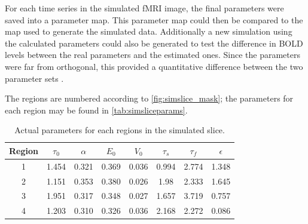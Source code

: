 For each time series in the simulated \ac{fMRI} image, the final parameters were saved
into a parameter map. This parameter map could then be compared to the map used to generate the
simulated data. Additionally a new simulation using the calculated parameters could also be
generated to test the difference in \ac{BOLD} levels between the real parameters and the
estimated ones. Since the parameters were far from orthogonal,
 this provided a quantitative difference between the two parameter sets \cite{Deneux2006}.

The regions are numbered according to \autoref{fig:simslice_mask}; the parameters
for each region may be found in \autoref{tab:simsliceparams}.

\begin{table}[t]
\centering
\begin{tabular}{|c |c | c | c | c | c | c | c |}
\hline
Region & $\tau_0$ & $\alpha$ & $E_0$    & $V_0$    & $\tau_s$ & $\tau_f$ & $\epsilon$  \\
\hline
1 & 1.454& 0.321& 0.369& 0.036& 0.994& 2.774& 1.348\\
2 &1.151&  0.353& 0.380& 0.026& 1.98&  2.333& 1.645 \\
3 &1.951&  0.317& 0.348& 0.027& 1.657& 3.719& 0.757 \\
4 &1.203 & 0.310& 0.326& 0.036& 2.168& 2.272& 0.086\\
\hline
\end{tabular}
\caption{Actual parameters for each regions in the simulated slice.}
\label{tab:simsliceparams}
\end{table}

